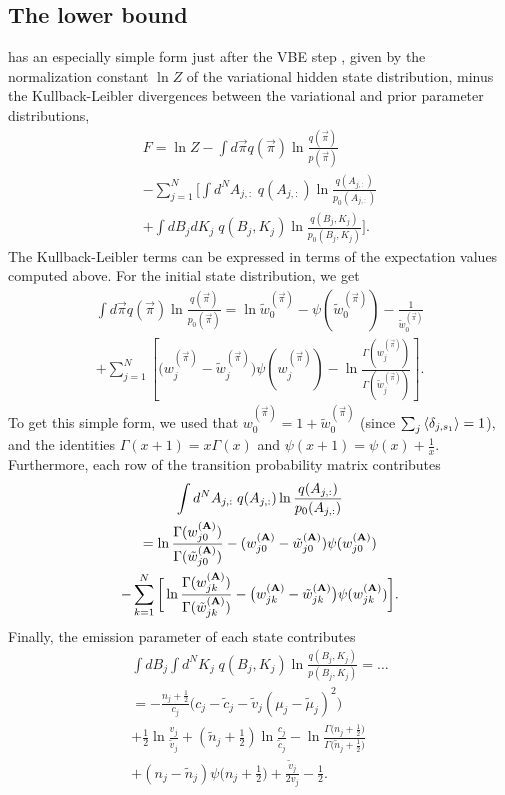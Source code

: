 \subsection{The lower bound}
has an especially simple form just after the VBE step
\cite{mackay1997,beal2003,persson2013}, given by the normalization
constant $\ln Z$ of the variational hidden state distribution, minus
the Kullback-Leibler divergences between the variational and prior
parameter distributions,
\begin{multline}
  F=\ln Z
  -\int d\vec{\pi} q(\vec{\pi}) \ln\frac{q(\vec{\pi})}{p(\vec{\pi})}\\
  -\sum_{j=1}^N\Bigg[
  \int d^NA_{j,:}\;q(A_{j,:})\ln\frac{q(A_{j,:})}{p_0(A_{j,:})}\\
  +\int dB_jdK_j\;q(B_j,K_j)\ln\frac{q(B_j,K_j)}{p_0(B_j,K_j)}
  \Bigg].
\end{multline}
The Kullback-Leibler terms can be expressed in terms of the
expectation values computed above. For the initial state distribution,
we get
\begin{multline}
  \int d\vec{\pi} q(\vec{\pi}) \ln\frac{q(\vec{\pi})}{p_0(\vec{\pi})}
  =\ln\tilde w_0^{(\vec{\pi})}
    -\psi(\tilde w_0^{(\vec{\pi})})-\frac{1}{\tilde w_0^{(\vec{\pi})}}\\
    +\sum_{j=1}^N\left[
      \big(w_j^{(\vec{\pi})}-\tilde w_j^{(\vec{\pi})}\big)\psi(w_j^{(\vec{\pi})})
      -\ln\frac{\Gamma(w_j^{(\vec{\pi})})}{\Gamma(\tilde w_j^{(\vec{\pi})})}
      \right].
\end{multline}
To get this simple form, we used that $w_0^{(\vec{\pi})}=1+\tilde
w_0^{(\vec{\pi})}$ (since $\sum_j\left\langle \delta_{j,s_1}\right\rangle=1$), and the
identities $\Gamma(x+1)=x\Gamma(x)$ and $\psi(x+1)=\psi(x)+\frac 1x$.
Furthermore, each row of the transition probability matrix contributes
\begin{multline}
  \int d^NA_{j,:}\;q(A_{j,:})\ln\frac{q(A_{j,:})}{p_0(A_{j,:})}\\
  =\ln\frac{\Gamma(w_{j0}^{(\mathbf{A})})}{\Gamma(\tilde w_{j0}^{(\mathbf{A})})}
    -(w_{j0}^{(\mathbf{A})}-\tilde w_{j0}^{(\mathbf{A})})\psi(w_{j0}^{(\mathbf{A})})\\
    -\sum_{k=1}^N\bigg[
      \ln\frac{\Gamma(w_{jk}^{(\mathbf{A})})}{\Gamma(\tilde w_{jk}^{(\mathbf{A})})}
      -\big(w_{jk}^{(\mathbf{A})}-\tilde w_{jk}^{(\mathbf{A})}\big)
      \psi(w_{jk}^{(\mathbf{A})})\bigg].
\end{multline}
Finally, the emission parameter of each state contributes
\begin{multline}\label{seq:KBKL}
  \int dB_j\int d^NK_j\;q(B_j,K_j)
  \ln\frac{q(B_j,K_j)}{p(B_j,K_j)}=\ldots\\
  =-\frac{n_j+\frac 12}{c_j}
    \Big(c_j-\tilde c_j-\tilde v_j(\mu_j-\tilde \mu_j)^2\Big)\\
    +\frac 12\ln\frac{v_j}{\tilde v_j}
    +(\tilde n_j+\frac 12)\ln\frac{c_j}{\tilde c_j}
    -\ln\frac{\Gamma\big(n_j+\frac 12\big)}{\Gamma\big(\tilde n_j+\frac 12\big)}\\
    +(n_j-\tilde n_j)\psi\big(n_j+\frac 12\big)
    +\frac{\tilde v_j}{2v_j}
    -\frac 12.
\end{multline}

